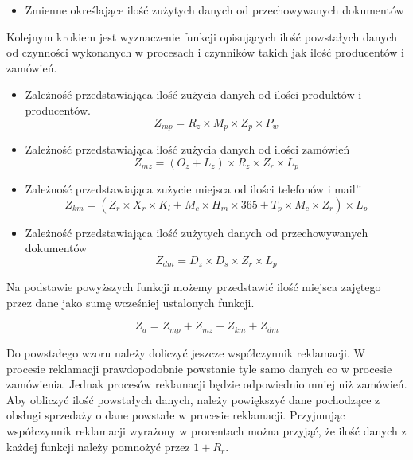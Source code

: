 \begin{itemize}
						\item Zmienne określające ilość zużytych danych od przechowywanych dokumentów
						\end{itemize}
		
						\par Kolejnym krokiem jest wyznaczenie funkcji opisujących ilość powstałych danych od czynności wykonanych w procesach i czynników takich jak ilość producentów i zamówień.
		
						\begin{itemize}
							\item Zależność przedstawiająca ilość zużycia danych od ilości produktów i producentów. 
								\[  Z_{mp} = R_z \times M_p \times Z_p \times P_w \]
					
							\item Zależność przedstawiająca ilość zużycia danych od ilości zamówień
								\[ Z_{mz} = ( O_z + L_z) \times R_z \times Z_r \times L_p \]
								
							\item Zależność przedstawiająca zużycie miejsca od ilości telefonów i mail'i
								\[ Z_{km} = (Z_r \times X_r \times K_l + M_c \times H_m \times 365 + T_p \times M_c \times Z_r ) \times L_p \]
								
							\item Zależność przedstawiająca ilość zużytych danych od przechowywanych dokumentów
								\[ Z_{dm} = D_z \times D_s \times Z_r \times L_p \]
						\end{itemize}
		
						Na podstawie powyższych funkcji możemy przedstawić ilość miejsca zajętego przez dane jako sumę wcześniej ustalonych funkcji.
		
						\[ Z_a = Z_{mp} + Z_{mz} + Z_{km} + Z_{dm} \]

						Do powstałego wzoru należy doliczyć jeszcze współczynnik reklamacji. W procesie reklamacji prawdopodobnie powstanie tyle samo danych co w procesie zamówienia. Jednak procesów reklamacji będzie odpowiednio mniej niż zamówień. Aby obliczyć ilość powstałych danych, należy powiększyć dane pochodzące z obsługi sprzedaży o dane powstałe w procesie reklamacji. Przyjmując współczynnik reklamacji wyrażony w procentach można przyjąć, że ilość danych z każdej funkcji należy pomnożyć przez \( 1 + R_r \).
			
